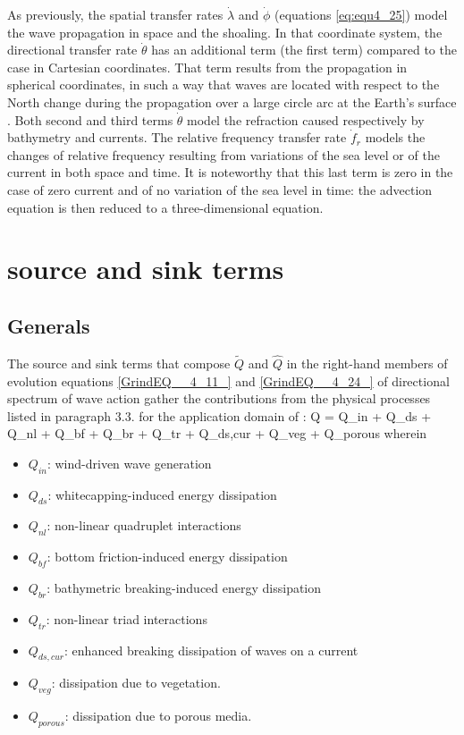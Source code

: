 As previously, the spatial transfer rates $\dot{\lambda }$ and $\dot{\phi }$
(equations \ref{eq:equ4_25}) model the wave propagation in space and the
shoaling. In that coordinate system, the directional transfer rate
$\dot{\theta }$ has an additional term (the first term) compared to the case
in Cartesian coordinates. That term results from the propagation in spherical
coordinates, in such a way that waves are located with respect to the North
change during the propagation over a large circle arc at the Earth's surface
\cite{Wamdi1988} \cite{Komen1994}. Both second and third terms $\dot{\theta }$
model the refraction caused respectively by bathymetry and currents. The
relative frequency transfer rate $\dot{f}_{r} $  models the changes of relative
frequency resulting from variations of the sea level or of the current in both
space and time. It is noteworthy that this last term is zero in the case of
zero current and of no variation of the sea level in time: the advection
equation is then reduced to a three-dimensional equation.


\section{ \tomawac source and sink terms}
\label{se:sourceterm}

\subsection{ Generals}

The source and sink terms that compose $\tilde{Q}$ and $\hat{Q}$ in the
right-hand members of evolution equations \eqref{GrindEQ__4_11_} and
\eqref{GrindEQ__4_24_} of directional spectrum of wave action gather the
contributions from the physical processes listed in paragraph 3.3. for
the application domain of \tomawac:
\bequ
\label{eq:semimp}
Q = Q_{in} + Q_{ds} + Q_{nl} + Q_{bf} + Q_{br} + Q_{tr} + Q_{ds,cur} + Q_{veg} +
Q_{porous}
\eequ
 wherein 
\begin{itemize}
\item $Q_{in}$: wind-driven wave generation
\item $Q_{ds}$: whitecapping-induced energy dissipation
\item $Q_{nl}$: non-linear quadruplet interactions
\item $Q_{bf}$: bottom friction-induced energy dissipation
\item $Q_{br}$: bathymetric breaking-induced energy dissipation
\item $Q_{tr}$: non-linear triad interactions
\item $Q_{ds,cur}$: enhanced breaking dissipation of waves on a current
\item $Q_{veg}$: dissipation due to vegetation.
\item $Q_{porous}$: dissipation due to porous media.
\end{itemize}

